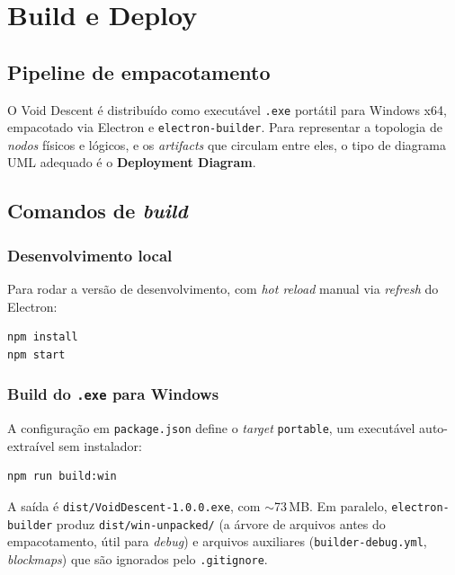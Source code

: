 \chapter{Build e Deploy}

\section{Pipeline de empacotamento}

O Void Descent é distribuído como executável \texttt{.exe} portátil para Windows
x64, empacotado via Electron e \texttt{electron-builder}. Para representar a
topologia de \emph{nodos} físicos e lógicos, e os \emph{artifacts} que circulam
entre eles, o tipo de diagrama UML adequado é o \textbf{Deployment Diagram}.


\section{Comandos de \emph{build}}

\subsection{Desenvolvimento local}

Para rodar a versão de desenvolvimento, com \emph{hot reload} manual via
\emph{refresh} do Electron:

\begin{verbatim}
npm install
npm start
\end{verbatim}

\subsection{Build do \texttt{.exe} para Windows}

A configuração em \texttt{package.json} define o \emph{target} \texttt{portable},
um executável auto-extraível sem instalador:

\begin{verbatim}
npm run build:win
\end{verbatim}

A saída é \texttt{dist/VoidDescent-1.0.0.exe}, com $\sim$73\,MB. Em paralelo,
\texttt{electron-builder} produz \texttt{dist/win-unpacked/} (a árvore de arquivos
antes do empacotamento, útil para \emph{debug}) e arquivos auxiliares
(\texttt{builder-debug.yml}, \emph{blockmaps}) que são ignorados pelo
\texttt{.gitignore}.

